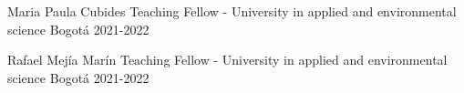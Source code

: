 


\begin{cvhonors}

  \cvhonor
    {Maria Paula Cubides} %
    {Teaching Fellow - University in applied and environmental science} %
    {Bogotá} %
    {2021-2022} %

  \cvhonor
    {Rafael Mejía Marín} %
    {Teaching Fellow - University in applied and environmental science} %
    {Bogotá} %
    {2021-2022} %

\end{cvhonors}
